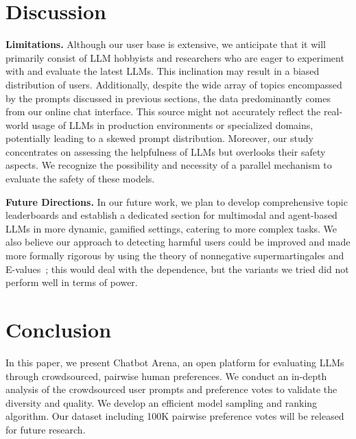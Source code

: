 \documentclass{article}
\newcommand{\system}{Chatbot Arena\xspace}
\begin{document}
\section{Discussion}

\textbf{Limitations.} 
Although our user base is extensive, we anticipate that it will primarily consist of LLM hobbyists and researchers who are eager to experiment with and evaluate the latest LLMs. This inclination may result in a biased distribution of users. Additionally, despite the wide array of topics encompassed by the prompts discussed in previous sections, the data predominantly comes from our online chat interface. This source might not accurately reflect the real-world usage of LLMs in production environments or specialized domains, potentially leading to a skewed prompt distribution. Moreover, our study concentrates on assessing the helpfulness of LLMs but overlooks their safety aspects. We recognize the possibility and necessity of a parallel mechanism to evaluate the safety of these models.

\textbf{Future Directions.}
In our future work, we plan to develop comprehensive topic leaderboards and establish a dedicated section for multimodal and agent-based LLMs in more dynamic, gamified settings, catering to more complex tasks.
We also believe our approach to detecting harmful users could be improved and made more formally rigorous by using the theory of nonnegative supermartingales and E-values~\cite{howard2020time, waudby2020estimating, vovk2021values, ramdas2023game}; this would deal with the dependence, but the variants we tried did not perform well in terms of power.


\section{Conclusion}

In this paper, we present \system, an open platform for evaluating LLMs through crowdsourced, pairwise human preferences.
We conduct an in-depth analysis of the crowdsourced user prompts and preference votes to validate the diversity and quality.
We develop an efficient model sampling and ranking algorithm.
Our dataset including 100K pairwise preference votes will be released for future research.

\end{document}
